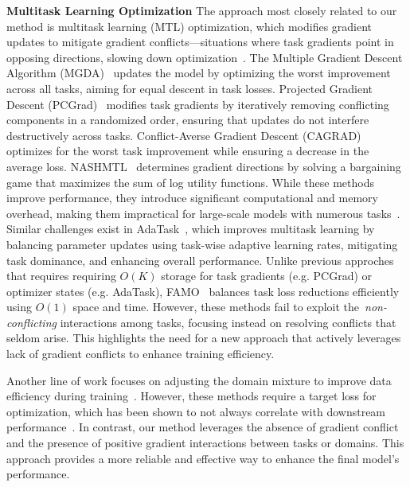 \textbf{\small Multitask Learning Optimization}  
The approach most closely related to our method is multitask learning (MTL) optimization, which modifies gradient updates to mitigate gradient conflicts—situations where task gradients point in opposing directions, slowing down optimization~\citep{vandenhende2021multi, yu2020gradient}. The Multiple Gradient Descent Algorithm (MGDA)~\citep{desideri2012multiple, sener2018multi} updates the model by optimizing the worst improvement across all tasks, aiming for equal descent in task losses. Projected Gradient Descent (PCGrad)~\citep{yu2020gradient} modifies task gradients by iteratively removing conflicting components in a randomized order, ensuring that updates do not interfere destructively across tasks. Conflict-Averse Gradient Descent (CAGRAD)~\citep{liu2021conflict} optimizes for the worst task improvement while ensuring a decrease in the average loss. NASHMTL~\citep{navon2022multi} determines gradient directions by solving a bargaining game that maximizes the sum of log utility functions. While these methods improve performance, they introduce significant computational and memory overhead, making them impractical for large-scale models with numerous tasks~\citep{xin2022current}. Similar challenges exist in AdaTask~\citep{yang2023adatask}, which improves multitask learning by balancing parameter updates using task-wise adaptive learning rates, mitigating task dominance, and enhancing overall performance. Unlike previous approches that requires  requiring \(O(K)\) storage for task gradients (e.g. PCGrad) or optimizer states (e.g. AdaTask), FAMO~\citep{liu2024famo} balances task loss reductions efficiently using \(O(1)\) space and time. However, these methods fail to exploit the~\textit{non-conflicting} interactions among tasks, focusing instead on resolving conflicts that seldom arise. This highlights the need for a new approach that actively leverages lack of gradient conflicts to enhance training efficiency. 

Another line of work focuses on adjusting the domain mixture to improve data efficiency during training~\citep{xie2024doremi, xia2023sheared, jiang2024adaptive}. However, these methods require a target loss for optimization, which has been shown to not always correlate with downstream performance~\citep{tay2021scale, liu2023same, wettig2024qurating}. In contrast, our method leverages the absence of gradient conflict and the presence of positive gradient interactions between tasks or domains. This approach provides a more reliable and effective way to enhance the final model's performance.